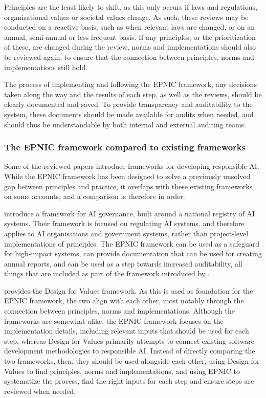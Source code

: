 Principles are the least likely to shift, as this only occurs if laws and regulations, organisational values or societal values change. As such, these reviews may be conducted on a reactive basis, such as when relevant laws are changed, or on an annual, semi-annual or less frequent basis. If any principles, or the prioritization of these, are changed during the review, norms and implementations should also be reviewed again, to ensure that the connection between principles, norms and implementations still hold.

The process of implementing and following the EPNIC framework, any decisions taken along the way and the results of each step, as well as the reviews, should be clearly documented and saved. To provide transparency and auditability to the system, these documents should be made available for audits when needed, and should thus be understandable by both internal and external auditing teams.

\subsubsection{The EPNIC framework compared to existing frameworks}
Some of the reviewed papers introduce frameworks for developing responsible AI. While the EPNIC framework has been designed to solve a previously unsolved gap between principles and practice, it overlaps with these existing frameworks on some accounts, and a comparison is therefore in order.

\textcite{Chen_2020} introduce a framework for AI governance, built around a national registry of AI systems. Their framework is focused on regulating AI systems, and therefore applies to AI organisations and government systems, rather than project-level implementations of principles. The EPNIC framework can be used as a safeguard for high-impact systems, can provide documentation that can be used for creating annual reports, and can be used as a step towards increased auditability, all things that are included as part of the framework introduced by \textcite{Chen_2020}.

\textcite{Dignum_2019} provides the Design for Values framework. As this is used as foundation for the EPNIC framework, the two align with each other, most notably through the connection between principles, norms and implementations. Although the frameworks are somewhat alike, the EPNIC framework focuses on the implementation details, including relevant inputs that should be used for each step, whereas Design for Values primarily attempts to connect existing software development methodologies to responsible AI. Instead of directly comparing the two frameworks, then, they should be used alongside each other, using Design for Values to find principles, norms and implementations, and using EPNIC to systematize the process, find the right inputs for each step and ensure steps are reviewed when needed.

